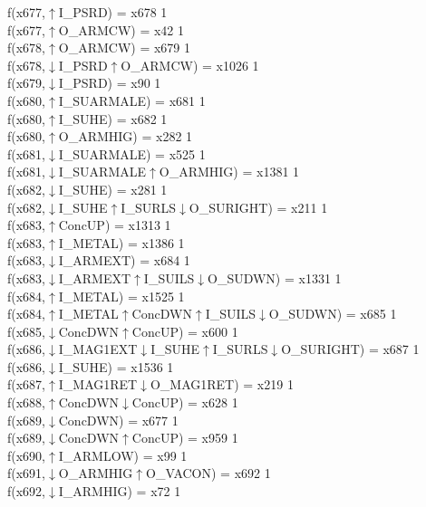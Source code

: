 f(x677,$\uparrow$I\_PSRD) = x678 {1} \\
f(x677,$\uparrow$O\_ARMCW) = x42 {1} \\
f(x678,$\uparrow$O\_ARMCW) = x679 {1} \\
f(x678,$\downarrow$I\_PSRD$\uparrow$O\_ARMCW) = x1026 {1} \\
f(x679,$\downarrow$I\_PSRD) = x90 {1} \\
f(x680,$\uparrow$I\_SUARMALE) = x681 {1} \\
f(x680,$\uparrow$I\_SUHE) = x682 {1} \\
f(x680,$\uparrow$O\_ARMHIG) = x282 {1} \\
f(x681,$\downarrow$I\_SUARMALE) = x525 {1} \\
f(x681,$\downarrow$I\_SUARMALE$\uparrow$O\_ARMHIG) = x1381 {1} \\
f(x682,$\downarrow$I\_SUHE) = x281 {1} \\
f(x682,$\downarrow$I\_SUHE$\uparrow$I\_SURLS$\downarrow$O\_SURIGHT) = x211 {1} \\
f(x683,$\uparrow$ConcUP) = x1313 {1} \\
f(x683,$\uparrow$I\_METAL) = x1386 {1} \\
f(x683,$\downarrow$I\_ARMEXT) = x684 {1} \\
f(x683,$\downarrow$I\_ARMEXT$\uparrow$I\_SUILS$\downarrow$O\_SUDWN) = x1331 {1} \\
f(x684,$\uparrow$I\_METAL) = x1525 {1} \\
f(x684,$\uparrow$I\_METAL$\uparrow$ConcDWN$\uparrow$I\_SUILS$\downarrow$O\_SUDWN) = x685 {1} \\
f(x685,$\downarrow$ConcDWN$\uparrow$ConcUP) = x600 {1} \\
f(x686,$\downarrow$I\_MAG1EXT$\downarrow$I\_SUHE$\uparrow$I\_SURLS$\downarrow$O\_SURIGHT) = x687 {1} \\
f(x686,$\downarrow$I\_SUHE) = x1536 {1} \\
f(x687,$\uparrow$I\_MAG1RET$\downarrow$O\_MAG1RET) = x219 {1} \\
f(x688,$\uparrow$ConcDWN$\downarrow$ConcUP) = x628 {1} \\
f(x689,$\downarrow$ConcDWN) = x677 {1} \\
f(x689,$\downarrow$ConcDWN$\uparrow$ConcUP) = x959 {1} \\
f(x690,$\uparrow$I\_ARMLOW) = x99 {1} \\
f(x691,$\downarrow$O\_ARMHIG$\uparrow$O\_VACON) = x692 {1} \\
f(x692,$\downarrow$I\_ARMHIG) = x72 {1} \\

